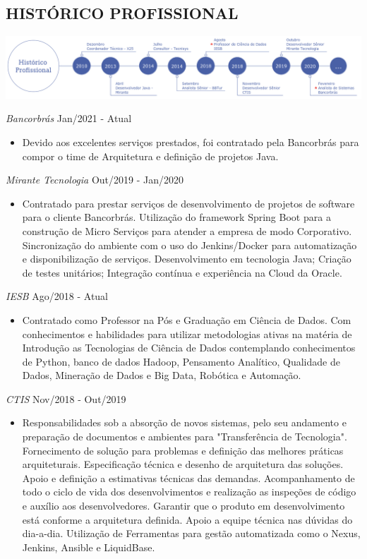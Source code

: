 \documentclass{res}
\begin{document}
\begin{resume}
		\section{HISTÓRICO PROFISSIONAL} %
		\vspace{8pt}
		\includegraphics[width=1.0\textwidth]{imagens/experiencia.png}
		
		{\sl Bancorbrás} \hfill Jan/2021 - Atual
		\begin{itemize}
			\item Devido aos excelentes serviços prestados, foi contratado pela Bancorbrás para compor o time de Arquitetura e definição de projetos Java. 
		\end{itemize}

		{\sl Mirante Tecnologia} \hfill Out/2019 - Jan/2020
		\begin{itemize}
			\item Contratado para prestar serviços de desenvolvimento de projetos de software para o cliente Bancorbrás. Utilização do framework Spring Boot para a construção de Micro Serviços para atender a empresa de modo Corporativo. Sincronização do ambiente com o uso do Jenkins/Docker para automatização e disponibilização de serviços. Desenvolvimento em tecnologia Java; Criação de testes unitários; Integração contínua e experiência na Cloud da Oracle. 
		\end{itemize}
		
		{\sl IESB} \hfill Ago/2018 - Atual
		\begin{itemize}
			\item Contratado como Professor na Pós e Graduação em Ciência de Dados. Com conhecimentos e habilidades para utilizar metodologias ativas na matéria de Introdução as Tecnologias de Ciência de Dados contemplando conhecimentos de Python, banco de dados Hadoop, Pensamento Analítico, Qualidade de Dados, Mineração de Dados e Big Data, Robótica e Automação.
		\end{itemize}
		
		{\sl CTIS} \hfill Nov/2018 - Out/2019
		\begin{itemize}
			\item Responsabilidades sob a absorção de novos sistemas, pelo seu andamento e preparação de documentos e ambientes para "Transferência de Tecnologia". Fornecimento de solução para problemas e definição das melhores práticas arquiteturais. Especificação técnica e desenho de arquitetura das soluções. Apoio e definição a estimativas técnicas das demandas. Acompanhamento de todo o ciclo de vida dos desenvolvimentos e realização as inspeções de código e auxílio aos desenvolvedores. Garantir que o produto em desenvolvimento está conforme a arquitetura definida. Apoio a equipe técnica nas dúvidas do dia-a-dia. Utilização de Ferramentas para gestão automatizada como o Nexus, Jenkins, Ansible e LiquidBase.
		\end{itemize}
		

\end{resume}
\end{document}

